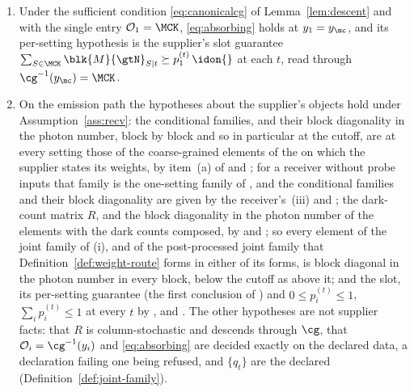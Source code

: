 \begin{proposition}
\begin{enumerate}[label=(\roman*),leftmargin=2.4em]
\begin{equation*}
    \blk{M}{\gtN}_{(y_i,t)}\ \succeq\ p_{(y_i,t)}\,\idon{} ,
  \end{equation*}
  which is \eqref{eq:certroute}; so the emitted $(p_v)$ are
   in the sense of Definition~\ref{def:targets} and they lie on the declared
  lattice.
\item Under the sufficient condition \eqref{eq:canonicalcg} of
  Lemma~\ref{lem:descent} and with the single entry $\mathcal{O}_1=\MCK$,
  \eqref{eq:absorbing} holds at $y_1=y_{\mc}$, and its per-setting hypothesis
  is the supplier's slot guarantee
  $\sum_{S\in\MCK}\blk{M}{\gtN}_{S|t}\succeq p^{(t)}_1\,\idon{}$ at each $t$,
  read through $\cg^{-1}(y_{\mc})=\MCK$.
\item On the emission path the hypotheses about the supplier's objects hold
  under Assumption~\ref{ass:recv}: the conditional families, and their
  block diagonality in the photon number, block by block and so in
  particular at the cutoff, are at every setting those of the coarse-grained
  elements of the  on which the supplier states its
  weights, by item~(a) of  and
  ; for a receiver without probe inputs
  that family is the one-setting family of
  , and the conditional families and
  their block diagonality are given by the receiver's
  \,(iii) and
  ; the
  dark-count matrix $R$, and the block diagonality in the photon number of
  the elements with the dark counts composed, by
   and
  ; so every element of
  the joint family of (i), and of the post-processed joint family that
  Definition~\ref{def:weight-route} forms in either of its forms, is block
  diagonal in the photon number in every block, below the cutoff as above
  it; and the slot, its
  per-setting guarantee (the first conclusion of
  ) and $0\le p^{(t)}_i\le1$,
  $\sum_ip^{(t)}_i\le1$ at every $t$ by ,
   and . The
  other hypotheses are not supplier facts: that $R$ is column-stochastic and descends through $\cg$, that
  $\mathcal{O}_i=\cg^{-1}(y_i)$ and \eqref{eq:absorbing} are decided exactly
  on the declared data, a declaration failing one being
  refused, and $\{q_t\}$ are the declared 
  (Definition~\ref{def:joint-family}).
\end{enumerate}
\end{proposition}

